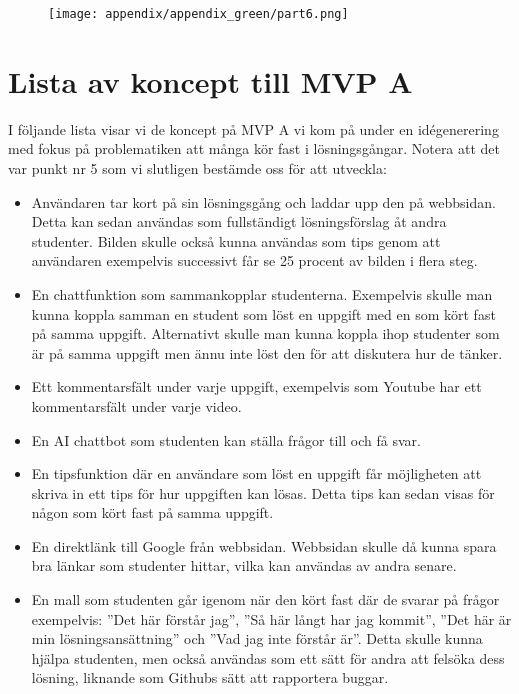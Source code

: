 \begin{figure}[H]
    \centering
    \texttt{[image: appendix/appendix\_green/part6.png]}
    \caption*{}
    \label{fig:nr8_part8}
\end{figure}

\newpage

\section{Lista av koncept till MVP A}
\label{app:koncept}

I följande lista visar vi de koncept på MVP A vi kom på under en idégenerering med fokus på problematiken att många kör fast i lösningsgångar. Notera att det var punkt nr 5 som vi slutligen bestämde oss för att utveckla:
\begin{itemize}
    \item Användaren tar kort på sin lösningsgång och laddar upp den på webbsidan. Detta kan sedan användas som fullständigt lösningsförslag åt andra studenter. Bilden  skulle också kunna användas som tips genom att användaren exempelvis successivt får se 25 procent av bilden i flera steg. 
    \item En chattfunktion som sammankopplar studenterna. Exempelvis skulle man kunna koppla samman en student som löst en uppgift med en som kört fast på samma uppgift. Alternativt skulle man kunna koppla ihop studenter som är på samma uppgift men ännu inte löst den för att diskutera hur de tänker.  
    \item Ett kommentarsfält under varje uppgift, exempelvis som Youtube har ett kommentarsfält under varje video.   
    \item En AI chattbot som studenten kan ställa frågor till och få svar. 
    \item En tipsfunktion där en användare som löst en uppgift får möjligheten att skriva in ett tips för hur uppgiften kan lösas. Detta tips kan sedan visas för någon som kört fast på samma uppgift.
    \item En direktlänk till Google från webbsidan. Webbsidan skulle då kunna spara bra länkar som studenter hittar, vilka kan användas av andra senare.  
    \item En mall som studenten går igenom när den kört fast där de svarar på frågor exempelvis: ''Det här förstår jag'', ''Så här långt har jag kommit'', ''Det här är min lösningsansättning'' och ''Vad jag inte förstår är''. Detta skulle kunna hjälpa studenten, men också användas som ett sätt för andra att felsöka dess lösning, liknande som Githubs sätt att rapportera buggar.  
\end{itemize}